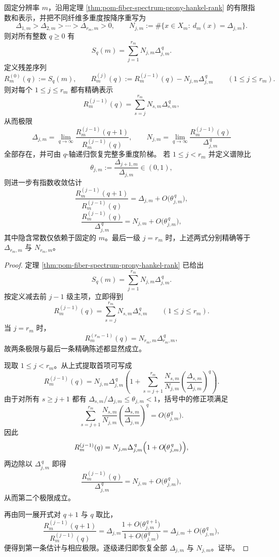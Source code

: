 \begin{theorem}\label{thm:pom-power-sum-recursive-spectrum-peeling}
固定分辨率 \(m\)，沿用定理 \ref{thm:pom-fiber-spectrum-prony-hankel-rank} 的有限指数和表示，并把不同纤维多重度按降序重写为
\[
\Delta_{1,m}>\Delta_{2,m}>\cdots>\Delta_{r_m,m}>0,
\qquad
N_{j,m}:=\#\{x\in X_m:\ d_m(x)=\Delta_{j,m}\}.
\]
则对所有整数 \(q\ge 0\) 有
\[
S_q(m)=\sum_{j=1}^{r_m}N_{j,m}\Delta_{j,m}^{\,q}.
\]
定义残差序列
\[
R_m^{(0)}(q):=S_q(m),
\qquad
R_m^{(j)}(q):=R_m^{(j-1)}(q)-N_{j,m}\Delta_{j,m}^{\,q}
\qquad(1\le j\le r_m).
\]
则对每个 \(1\le j\le r_m\) 都有精确表示
\[
R_m^{(j-1)}(q)=\sum_{s=j}^{r_m}N_{s,m}\Delta_{s,m}^{\,q},
\]
从而极限
\[
\Delta_{j,m}
=
\lim_{q\to\infty}\frac{R_m^{(j-1)}(q+1)}{R_m^{(j-1)}(q)},
\qquad
N_{j,m}
=
\lim_{q\to\infty}\frac{R_m^{(j-1)}(q)}{\Delta_{j,m}^{\,q}}
\]
全部存在，并可由 \(q\)-轴递归恢复完整多重度阶梯。
若 \(1\le j<r_m\) 并定义谱隙比
\[
\theta_{j,m}:=\frac{\Delta_{j+1,m}}{\Delta_{j,m}}\in(0,1),
\]
则进一步有指数收敛估计
\[
\boxed{
\frac{R_m^{(j-1)}(q+1)}{R_m^{(j-1)}(q)}
=
\Delta_{j,m}+O\!\bigl(\theta_{j,m}^{\,q}\bigr),
}
\]
\[
\boxed{
\frac{R_m^{(j-1)}(q)}{\Delta_{j,m}^{\,q}}
=
N_{j,m}+O\!\bigl(\theta_{j,m}^{\,q}\bigr),
}
\]
其中隐含常数仅依赖于固定的 \(m\)。最后一级 \(j=r_m\) 时，上述两式分别精确等于 \(\Delta_{r_m,m}\) 与 \(N_{r_m,m}\)。
\end{theorem}
\begin{proof}
定理 \ref{thm:pom-fiber-spectrum-prony-hankel-rank} 已给出
\[
S_q(m)=\sum_{j=1}^{r_m}N_{j,m}\Delta_{j,m}^{\,q}.
\]
按定义减去前 \(j-1\) 级主项，立即得到
\[
R_m^{(j-1)}(q)=\sum_{s=j}^{r_m}N_{s,m}\Delta_{s,m}^{\,q}
\qquad(1\le j\le r_m).
\]
当 \(j=r_m\) 时，
\[
R_m^{(r_m-1)}(q)=N_{r_m,m}\Delta_{r_m,m}^{\,q},
\]
故两条极限与最后一条精确陈述都显然成立。

现取 \(1\le j<r_m\)。从上式提取首项可写成
\[
R_m^{(j-1)}(q)
=
N_{j,m}\Delta_{j,m}^{\,q}
\left(
1+
\sum_{s=j+1}^{r_m}\frac{N_{s,m}}{N_{j,m}}
\left(\frac{\Delta_{s,m}}{\Delta_{j,m}}\right)^q
\right).
\]
由于对所有 \(s\ge j+1\) 都有
\(
\Delta_{s,m}/\Delta_{j,m}\le \theta_{j,m}<1
\)，括号中的修正项满足
\[
\sum_{s=j+1}^{r_m}\frac{N_{s,m}}{N_{j,m}}
\left(\frac{\Delta_{s,m}}{\Delta_{j,m}}\right)^q
=
O\!\bigl(\theta_{j,m}^{\,q}\bigr).
\]
因此
\[
R_m^{(j-1)}(q)
=
N_{j,m}\Delta_{j,m}^{\,q}
\Bigl(1+O\!\bigl(\theta_{j,m}^{\,q}\bigr)\Bigr),
\]
两边除以 \(\Delta_{j,m}^{\,q}\) 即得
\[
\frac{R_m^{(j-1)}(q)}{\Delta_{j,m}^{\,q}}
=
N_{j,m}+O\!\bigl(\theta_{j,m}^{\,q}\bigr),
\]
从而第二个极限成立。

再由同一展开式对 \(q+1\) 与 \(q\) 取比，
\[
\frac{R_m^{(j-1)}(q+1)}{R_m^{(j-1)}(q)}
=
\Delta_{j,m}
\frac{1+O\!\bigl(\theta_{j,m}^{\,q+1}\bigr)}
{1+O\!\bigl(\theta_{j,m}^{\,q}\bigr)}
=
\Delta_{j,m}+O\!\bigl(\theta_{j,m}^{\,q}\bigr),
\]
便得到第一条估计与相应极限。逐级递归即恢复全部 \(\Delta_{j,m}\) 与 \(N_{j,m}\)。证毕。
\end{proof}

\endinput
